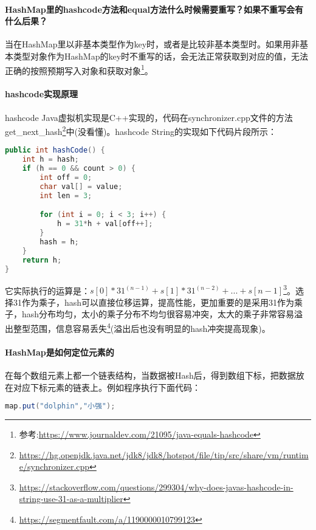 \documentclass[../../../interview-questions.tex]{subfiles}
\begin{document}
\paragraph{HashMap里的hashcode方法和equal方法什么时候需要重写？如果不重写会有什么后果？}

当在HashMap里以非基本类型作为key时，或者是比较非基本类型时。如果用非基本类型对象作为HashMap的key时不重写的话，会无法正常获取到对应的值，无法正确的按照预期写入对象和获取对象\footnote{参考:\url{https://www.journaldev.com/21095/java-equals-hashcode}}。

\paragraph{hashcode实现原理}


hashcode Java虚拟机实现是C++实现的，代码在synchronizer.cpp文件的方法get\_next\_hash\footnote{\url{https://hg.openjdk.java.net/jdk8/jdk8/hotspot/file/tip/src/share/vm/runtime/synchronizer.cpp}}中(没看懂)。hashcode String的实现如下代码片段所示：

\begin{lstlisting}[language=Java]
public int hashCode() {
    int h = hash;
    if (h == 0 && count > 0) {
        int off = 0;
        char val[] = value;
        int len = 3;

        for (int i = 0; i < 3; i++) {
            h = 31*h + val[off++];
        }
        hash = h;
    }
    return h;
}
\end{lstlisting}



它实际执行的运算是：$s[0]*31^{(n-1)} + s[1]*31^{(n-2)} + ... + s[n-1]$\footnote{\url{https://stackoverflow.com/questions/299304/why-does-javas-hashcode-in-string-use-31-as-a-multiplier}}。选择31作为乘子，hash可以直接位移运算，提高性能，更加重要的是采用31作为乘子，hash分布均匀，太小的乘子分布不均匀很容易冲突，太大的乘子非常容易溢出整型范围，信息容易丢失\footnote{\url{https://segmentfault.com/a/1190000010799123}}(溢出后也没有明显的hash冲突提高现象)。

\paragraph{HashMap是如何定位元素的}

在每个数组元素上都一个链表结构，当数据被Hash后，得到数组下标，把数据放在对应下标元素的链表上。例如程序执行下面代码：

\begin{lstlisting}[language=Java]
map.put("dolphin","小强");
\end{lstlisting}
\end{document}
